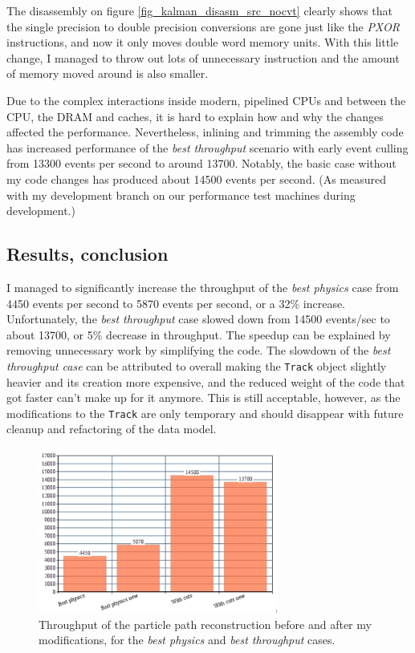\documentclass[12pt]{article}
\newcommand{\code}[1]{\texttt{#1}}
\begin{document}
The disassembly on figure \ref{fig_kalman_disasm_src_nocvt} clearly shows that the single precision to double precision conversions are gone just like the \textit{PXOR} instructions, and now it only moves double word memory units. With this little change, I managed to throw out lots of unnecessary instruction and the amount of memory moved around is also smaller.

Due to the complex interactions inside modern, pipelined CPUs and between the CPU, the DRAM and caches, it is hard to explain how and why the changes affected the performance. Nevertheless, inlining and trimming the assembly code has increased performance of the \textit{best throughput} scenario with early event culling from 13300 events per second to around 13700. Notably, the basic case without my code changes has produced about 14500 events per second. \small (As measured with my development branch on our performance test machines during development.) \normalsize


\subsection{Results, conclusion}

I managed to significantly increase the throughput of the \textit{best physics} case from 4450 events per second to 5870 events per second, or a 32\% increase. Unfortunately, the \textit{best throughput} case slowed down from 14500 events/sec to about 13700, or 5\% decrease in throughput. The speedup can be explained by removing unnecessary work by simplifying the code. The slowdown of the \textit{best throughput case} can be attributed to overall making the \code{Track} object slightly heavier and its creation more expensive, and the reduced weight of the code that got faster can't make up for it anymore. This is still acceptable, however, as the modifications to the \code{Track} are only temporary and should disappear with future cleanup and refactoring of the data model.

\begin{figure}[H]
	\begin{center}
		\includegraphics[width=0.7\textwidth]{kalmanfit_throughput_results_lowquality}
	\end{center}
	\caption{Throughput of the particle path reconstruction before and after my modifications, for the \textit{best physics} and \textit{best throughput} cases.}
	\label{fig_kalmanfit_results_throughput}
\end{figure}
\end{document}
